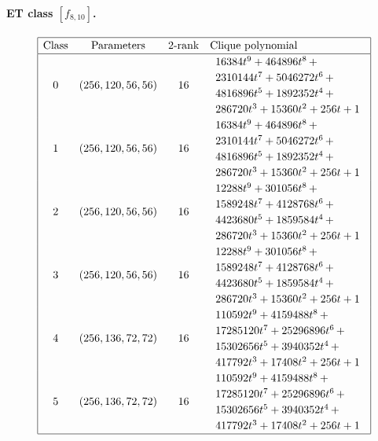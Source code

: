 \documentclass[12pt,a4paper]{article}
\begin{document}
\paragraph*{ET class $[f_{8,10}]$.}

\small{}
\begin{align*}
\def\arraystretch{1.2}
\begin{array}{|cccl|}
\hline
\text{Class} &
\text{Parameters} &
\text{2-rank} &
\text{Clique polynomial}
\\
\hline
0 &
(256, 120, 56, 56) &
16 &
\begin{array}{l}
16384t^{9} + 464896t^{8}
\,+
\\
 2310144t^{7} + 5046272t^{6}
\,+
\\
 4816896t^{5} + 1892352t^{4}
\,+
\\
 286720t^{3} + 15360t^{2} + 256t + 1
\end{array}
\\
1 &
(256, 120, 56, 56) &
16 &
\begin{array}{l}
16384t^{9} + 464896t^{8}
\,+
\\
 2310144t^{7} + 5046272t^{6}
\,+
\\
 4816896t^{5} + 1892352t^{4}
\,+
\\
 286720t^{3} + 15360t^{2} + 256t + 1
\end{array}
\\
2 &
(256, 120, 56, 56) &
16 &
\begin{array}{l}
12288t^{9} + 301056t^{8}
\,+
\\
 1589248t^{7} + 4128768t^{6}
\,+
\\
 4423680t^{5} + 1859584t^{4}
\,+
\\
 286720t^{3} + 15360t^{2} + 256t + 1
\end{array}
\\
3 &
(256, 120, 56, 56) &
16 &
\begin{array}{l}
12288t^{9} + 301056t^{8}
\,+
\\
 1589248t^{7} + 4128768t^{6}
\,+
\\
 4423680t^{5} + 1859584t^{4}
\,+
\\
 286720t^{3} + 15360t^{2} + 256t + 1
\end{array}
\\
4 &
(256, 136, 72, 72) &
16 &
\begin{array}{l}
110592t^{9} + 4159488t^{8}
\,+
\\
 17285120t^{7} + 25296896t^{6}
\,+
\\
 15302656t^{5} + 3940352t^{4}
\,+
\\
 417792t^{3} + 17408t^{2} + 256t + 1
\end{array}
\\
5 &
(256, 136, 72, 72) &
16 &
\begin{array}{l}
110592t^{9} + 4159488t^{8}
\,+
\\
 17285120t^{7} + 25296896t^{6}
\,+
\\
 15302656t^{5} + 3940352t^{4}
\,+
\\
 417792t^{3} + 17408t^{2} + 256t + 1
\end{array}
\\
\hline
\end{array}
\end{align*}
\end{document}
